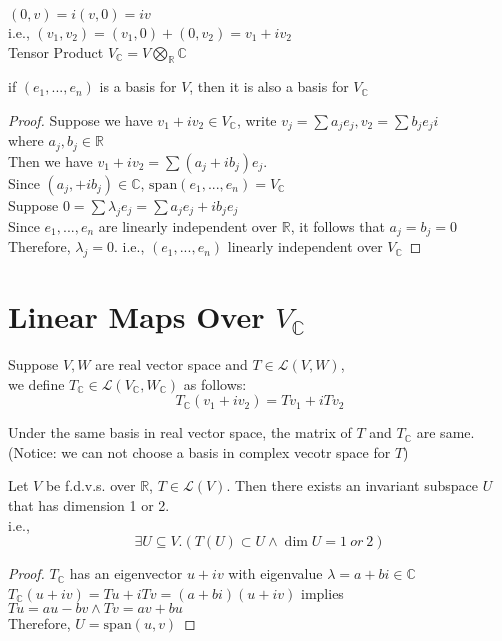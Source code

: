 \documentclass{aq-notes}
\begin{document}
    \begin{remark}
        
        $(0,v) = i(v,0) = iv$\\
        i.e., $(v_1,v_2) = (v_1,0) + (0, v_2)  = v_1 + iv_2$\\
        Tensor Product $V_\mathbb{C} = V\bigotimes_\mathbb{R} \mathbb{C}$
    \end{remark}
    \begin{lemma}
        if $(e_1,...,e_n)$ is a basis for $V$, then it is also a basis for $V_\mathbb{C}$
    \end{lemma}
    \begin{proof}
        Suppose we have $v_1 + iv_2 \in V_\mathbb{C}$, write $\displaystyle v_j = \sum a_je_j, v_2 = \sum b_j e_j i$\\ 
        where $ a_j, b_j \in \mathbb{R}$\\
        Then we have $v_1 + iv_2 = \sum (a_j + ib_j)e_j$.\\ 
        Since $(a_j, + ib_j) \in \mathbb{C}$, $\mbox{span} (e_1,...,e_n) = V_\mathbb{C}$\\[1em]
        Suppose $\displaystyle 0 = \sum \lambda_je_j = \sum a_je_j + i b_je_j$\\
        Since $e_1,...,e_n$ are linearly independent over $\mathbb{R}$, it follows that $a_j = b_j  = 0$\\
        Therefore, $\lambda_j = 0$. i.e., $(e_1,...,e_n)$ linearly independent over $V_\mathbb{C}$
    \end{proof}
    \section{Linear Maps Over $V_\mathbb{C}$}
    Suppose $V, W$ are real vector space and $T \in \mathcal{L}(V,W)$,\\ 
    we define $T_\mathbb{C} \in \mathcal{L}(V_\mathbb{C}, W_\mathbb{C})$ as follows:
    \[T_\mathbb{C} (v_1 + iv_2) = Tv_1 + i Tv_2\]

\begin{claim}
        Under the same basis in real vector space, the matrix of $T$ and $T_\mathbb{C}$ are same.\\ 
        (Notice: we can not choose a basis in complex vecotr space for $T$)
\end{claim}
    \begin{theorem}
        Let $V$ be f.d.v.s. over $\mathbb{R}$, $T\in \mathcal{L}(V)$. Then there exists an invariant subspace $U$ that has dimension 1 or 2.\\
        i.e.,
        \[\exists U \subseteq V.( T(U) \subset U \wedge \dim U = 1\ or \ 2)\]
        \begin{proof}
            $T_\mathbb{C}$ has an eigenvector $u + iv$ with eigenvalue $\lambda = a + bi\in \mathbb{C}$\\
            $T_\mathbb{C}(u+ iv) = Tu + i Tv = (a+ bi)(u + iv)$ implies $Tu = au - bv \wedge Tv = av + bu$\\
            Therefore, $U = \mbox{span}(u,v)$
        \end{proof}
    \end{theorem}
\end{document}
